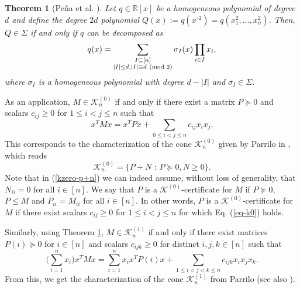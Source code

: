 \documentclass[11pt]{article}
\newcommand{\oR}{{\mathbb R}}
\newtheorem{theorem}{Theorem}[section]
\newcommand{\kzeroc}{\MK^{(0)}\text{-certificate}}
\numberwithin{equation}{section}
\newcommand{\MK}{{\mathcal K}}
\begin{document}
\begin{theorem}[Pe\~{n}a et al. \cite{PVZ2007}]\label{theo-squares-vera}
Let $q\in\oR[x]$ be a homogeneous polynomial of degree $d$ and define the degree $2d$ polynomial $Q(x):=q(x^{\circ 2})=q(x_1^2,\ldots,x_n^2)$. Then, $Q\in \Sigma$  if and only if $q$ can be decomposed as
\begin{align}
    q(x)=\sum_{\substack{I\subseteq[n] \\
    |I|\leq d, |I|\equiv d \ (\text{\rm mod } 2)}}\sigma_I(x)\prod_{i\in I}x_i,
\end{align}
where $\sigma_I$ is a homogeneous polynomial with  degree  $d-|I|$ and $\sigma_I\in \Sigma$.
\end{theorem}
As an application, $M\in \MK_n^{(0)}$ if and only if there exist a matrix $P\succeq 0$ and scalars $c_{ij}\geq 0$ for $1\leq i < j \leq n$ such that 
\begin{equation}\label{eq-k0}
x^TMx = x^TPx + \sum_{0\leq i< j \leq n}c_{ij}x_ix_j.
\end{equation}
This corresponds to the characterization of the cone $\MK_n^{(0)}$ given by Parrilo in \cite{Parrilo-thesis-2000}, which reads
\begin{equation}\label{kzero-p+n}
\MK_n^{(0)}=\{P+N \text{ : } P\succeq 0, N\geq 0\}.
\end{equation}
Note that in (\ref{kzero-p+n}) we can indeed assume, without loss of generality, that $N_{ii}=0$ for all $i\in[n]$. We say that $P$ is a {\em $\kzeroc$}  for $M$ if  $P\succeq 0$, $P\leq M$ and $P_{ii}=M_{ii}$ for all $i\in[n]$. In other words, $P$ is a $\MK^{(0)}$-certificate for $M$ if there exist scalars $c_{ij}\ge 0$ for $1\leq i<j\leq n$ for which Eq. (\ref{eq-k0}) holds.

Similarly, using  Theorem \ref{theo-squares-vera}, $M\in \MK_n^{(1)}$ if and only if there exist matrices $P(i)\succeq 0$ for $i\in [n]$ and scalars $c_{ijk}\geq 0$ for distinct $i,j,k\in [n]$  such that 
\begin{equation}\label{eqpM}
\Big(\sum_{i=1}^{n} x_i\Big)x^TMx= \sum_{i=1}^{n} x_i x^TP(i) x +\sum_{1\leq i<j<k\leq n} c_{ijk} x_ix_jx_k.
\end{equation}
From this, we get  the characterization of the cone $\MK^{(1)}_n$ from Parrilo \cite{Parrilo-thesis-2000} (see also \cite{dKP2002}).
\end{document}
